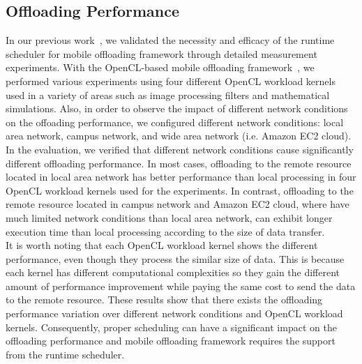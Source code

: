 \documentclass[10pt, conference, compsocconf]{IEEEtran}
\begin{document}
\subsection{Offloading Performance}
%
In our previous work~\cite{ml}, we validated the necessity and efficacy
of the runtime scheduler for mobile offloading framework through
detailed measurement experiments.
%
With the OpenCL-based mobile offloading framework~\cite{ocloff}, we
performed various experiments using four different OpenCL workload
kernels used in a variety of areas such as image processing filters and
mathematical simulations.
%
Also, in order to observe the impact of different network conditions on
the offoading performance, we configured different network conditions:
local area network, campus network, and wide area network (i.e. Amazon
EC2 cloud).
%
In the evaluation, we verified that different network conditions cause
significantly different offloading performance.
%
In most cases, offloading to the remote resource located in local area
network has better performance than local processing in four OpenCL
workload kernels used for the experiments.
%
In contrast, offloading to the remote resource located in campus network
and Amazon EC2 cloud, where have much limited network conditions than
local area network, can exhibit longer execution time than local
processing according to the size of data transfer.\\ 
%
\indent It is worth noting that each OpenCL workload kernel shows
the different performance, even though they process the similar size of
data.
%
This is because each kernel has different computational complexities so
they gain the different amount of performance improvement while paying
the same cost to send the data to the remote resource.
%
These results show that there exists the offloading performance
variation over different network conditions and OpenCL workload kernels.
%
Consequently, proper scheduling can have a significant impact on the
offloading performance and mobile offloading framework requires the
support from the runtime scheduler.
%
\end{document}
